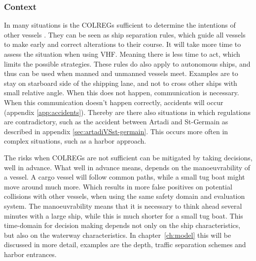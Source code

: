 
\subsubsection*{Context}
In many situations is the \acf{COLREGs} sufficient to determine the intentions of other vessels \cite{IMO1972}. They can be seen as ship separation rules, which guide all vessels to make early and correct alterations to their course. It will take more time to assess the situation when using \ac{VHF}. Meaning there is less time to act, which limits the possible strategies. These rules do also apply to autonomous ships, and thus can be used when manned and unmanned vessels meet.
Examples are to stay on starboard side of the shipping lane, and not to cross other ships with small relative angle. When this does not happen, communication is necessary. When this communication doesn't happen correctly, accidents will occur (appendix \ref{app:accidents}). Thereby are there also situations in which regulations are contradictory, such as the accident between Artadi and St-Germain as described in appendix \ref{sec:artadiVSst-germain}. This occurs more often in complex situations, such as a harbor approach.

The risks when \ac{COLREGs} are not sufficient can be mitigated by taking decisions, well in advance. What well in advance means, depends on the manoeuvrability of a vessel. A cargo vessel will follow common paths, while a small tug boat might move around much more. Which results in more false positives on potential collisions with other vessels, when using the same safety domain and evaluation system. The manoeuvrability means that it is necessary to think ahead several minutes with a large ship, while this is much shorter for a small tug boat. This time-domain for decision making depends not only on the ship characteristics, but also on the waterway characteristics. In chapter~\ref{ch:model} this will be discussed in more detail, examples are the depth, traffic separation schemes and harbor entrances.

